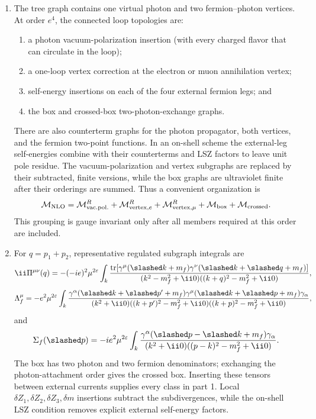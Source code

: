 
\begin{enumerate}
\begin{enumerate}
\item
The tree graph contains one virtual photon and two fermion--photon vertices.
At order \(e^4\), the connected loop topologies are:
\begin{enumerate}
\item a photon vacuum-polarization insertion (with every charged flavor that
can circulate in the loop);
\item a one-loop vertex correction at the electron or muon annihilation
vertex;
\item self-energy insertions on each of the four external fermion legs; and
\item the box and crossed-box two-photon-exchange graphs.
\end{enumerate}
There are also counterterm graphs for the photon propagator, both vertices,
and the fermion two-point functions.  In an on-shell scheme the external-leg
self-energies combine with their counterterms and LSZ factors to leave unit
pole residue.  The vacuum-polarization and vertex subgraphs are replaced by
their subtracted, finite versions, while the box graphs are ultraviolet
finite after their orderings are summed.  Thus a convenient organization is
\[
 \mathcal M_{\rm NLO}
 =\mathcal M_{\rm vac.pol.}^{R}
 +\mathcal M_{{\rm vertex},e}^{R}
 +\mathcal M_{{\rm vertex},\mu}^{R}
 +\mathcal M_{\rm box}
 +\mathcal M_{\rm crossed}.
\]
This grouping is gauge invariant only after all members required at this
order are included.
\item
For \(q=p_1+p_2\), representative regulated subgraph integrals are
\[
 \ii\Pi^{\mu\nu}(q)=-(-ie)^2\mu^{2\varepsilon}\int_k
 \frac{\operatorname{tr}[
 \gamma^\mu(\slashed k+m_f)\gamma^\nu(\slashed k+\slashed q+m_f)]}
 {(k^2-m_f^2+\ii0)((k+q)^2-m_f^2+\ii0)},
\]
\[
 \Lambda^\mu_f=-e^2\mu^{2\varepsilon}\int_k
 \frac{\gamma^\alpha(\slashed k+\slashed p'+m_f)\gamma^\mu
 (\slashed k+\slashed p+m_f)\gamma_\alpha}
 {(k^2+\ii0)((k+p')^2-m_f^2+\ii0)((k+p)^2-m_f^2+\ii0)},
\]
and
\[
 \Sigma_f(\slashed p)=-ie^2\mu^{2\varepsilon}\int_k
 \frac{\gamma^\alpha(\slashed p-\slashed k+m_f)\gamma_\alpha}
 {(k^2+\ii0)((p-k)^2-m_f^2+\ii0)}.
\]
The box has two photon and two fermion denominators; exchanging the
photon-attachment order gives the crossed box.  Inserting these tensors
between external currents supplies every class in part 1.  Local
\(\delta Z_1,\delta Z_2,\delta Z_3,\delta m\) insertions subtract the
subdivergences, while the on-shell LSZ condition removes explicit
external self-energy factors.
\end{enumerate}


\end{enumerate}
